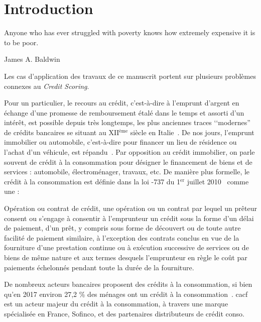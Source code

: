 \chapter*{Introduction} \label{chap_intro}

\epigraph{Anyone who has ever struggled with poverty knows how extremely expensive it is to be poor.}{James A. Baldwin}

Les cas d'application des travaux de ce manuscrit portent sur plusieurs problèmes connexes au \textit{Credit Scoring}.

Pour un particulier, le recours au crédit, c'est-à-dire à l'emprunt d'argent en échange d'une promesse de remboursement étalé dans le temps et assorti d'un intérêt, est possible depuis très longtemps, les plus anciennes traces ‘‘modernes'' de crédits bancaires se situant au XII$^\text{ème}$ siècle en Italie~\cite{thomas_wards_1828}. De nos jours, l'emprunt immobilier ou automobile, c'est-à-dire pour financer un lieu de résidence ou l'achat d'un véhicule, est répandu~\cite{la_tribune_2010}. Par opposition au crédit immobilier, on parle souvent de crédit à la consommation pour désigner le financement de biens et de services : automobile, électroménager, travaux, etc. De manière plus formelle, le crédit à la consommation est définie dans la loi -737 du 1$^\text{er}$ juillet 2010~\cite{noauthor_loi_2010} comme une :
\begin{displayquote}
Opération ou contrat de crédit, une opération ou un contrat par lequel un prêteur consent ou s’engage à consentir à l’emprunteur un crédit sous la forme d’un délai de paiement, d’un prêt, y compris sous forme de découvert ou de toute autre facilité de paiement similaire, à l’exception des contrats conclus en vue de la fourniture d’une prestation continue ou à exécution successive de services ou de biens de même nature et aux termes desquels l’emprunteur en règle le coût par paiements échelonnés pendant toute la durée de la fourniture.
\end{displayquote}

De nombreux acteurs bancaires proposent des crédits à la consommation, si bien qu'en 2017 environ 27,2 \% des ménages ont un crédit à la consommation~\cite{observatoire}. \gls{cacf} est un acteur majeur du crédit à la consommation, à travers une marque spécialisée en France, Sofinco, et des partenaires distributeurs de crédit conso.

